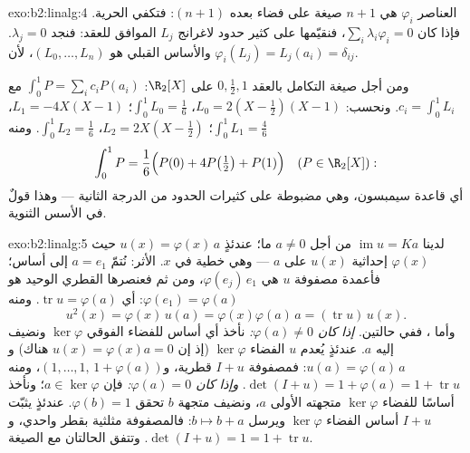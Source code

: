 \begin{solution}{exo:b2:linalg:4}
العناصر $\varphi_i$ هي $n + 1$ صيغة على فضاء بعده $(n+1)$:
فتكفي الحرية. فإذا كان $\sum_i \lambda_i \varphi_i = 0$، فنقيّمها على
كثير حدود لاغرانج $L_j$ الموافق للعقد: فنجد $\lambda_j = 0$. والأساس
القبلي هو $(L_0, \dots, L_n)$، لأن $\varphi_i(L_j) =
L_j(a_i) = \delta_{ij}$.

ومن أجل صيغة التكامل بالعقد $0, \frac12, 1$ على $\R_2[X]$:
$\int_0^1 P = \sum_i c_i P(a_i)$ مع $c_i = \int_0^1 L_i$. ونحسب:
$L_0 = 2(X - \tfrac12)(X - 1)$، $\int_0^1 L_0 = \frac16$؛ $L_1 =
-4X(X-1)$، $\int_0^1 L_1 = \frac46$؛ $L_2 = 2X(X - \tfrac12)$،
$\int_0^1 L_2 = \frac16$. ومنه
\[
\int_0^1 P = \frac{1}{6}\Bigl(P(0) + 4P\bigl(\tfrac12\bigr) +
P(1)\Bigr)
\quad (P \in \R_2[X]) :
\]
أي قاعدة سيمبسون، وهي مضبوطة على كثيرات الحدود من الدرجة الثانية ---
وهذا قولٌ في الأسس الثنوية.
\end{solution}

\begin{solution}{exo:b2:linalg:5}
لدينا $\operatorname{im} u = Ka$ من أجل $a \neq 0$ ما؛ عندئذٍ $u(x) =
\varphi(x)\,a$ حيث $\varphi(x)$ إحداثية $u(x)$ على $a$
--- وهي خطية في $x$. الأثر: نُتمّ $a = e_1$ إلى أساس؛ فأعمدة
مصفوفة $u$ هي $\varphi(e_j)\,e_1$، ومن ثم فعنصرها القطري الوحيد
هو $\varphi(e_1) = \varphi(a)$: أي $\operatorname{tr} u =
\varphi(a)$. ومنه
\[
u^2(x) = \varphi(x)\, u(a) = \varphi(x)\varphi(a)\, a
= (\operatorname{tr} u)\, u(x).
\]
وأما ، ففي حالتين. \emph{إذا كان $\varphi(a) \neq 0$:} نأخذ أي
أساس للفضاء الفوقي $\ker\varphi$ ونضيف إليه $a$. عندئذٍ يُعدم $u$
الفضاء $\ker\varphi$ (إذ إن $u(x) = \varphi(x)a = 0$ هناك) و$u(a) =
\varphi(a)\,a$: فمصفوفة $I + u$ قطرية، و$(1, \dots, 1,\,
1 + \varphi(a))$، ومنه $\det(I + u) = 1 + \varphi(a) = 1 +
\operatorname{tr} u$. \emph{وإذا كان $\varphi(a) = 0$:} فإن $a \in
\ker\varphi$؛ ونأخذ أساسًا للفضاء $\ker\varphi$ متجهته الأولى
$a$، ونضيف متجهة $b$ تحقق $\varphi(b) = 1$. عندئذٍ يثبّت $I + u$
أساس الفضاء $\ker\varphi$ ويرسل $b \mapsto b + a$:
فالمصفوفة مثلثية بقطر واحدي، و$\det(I + u) = 1 = 1 +
\operatorname{tr} u$. وتتفق الحالتان مع الصيغة.
\end{solution}


